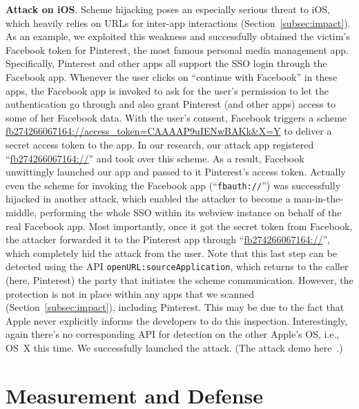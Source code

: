 \documentclass{article}
\begin{document}
\vspace {3pt}\noindent\textbf{Attack on iOS}. Scheme hijacking poses an especially serious threat to iOS, which heavily relies on URLs for inter-app interactions (Section~\ref{subsec:impact}).  As an example, we exploited this weakness and successfully obtained the victim's Facebook token for Pinterest, the most famous personal media management app. Specifically, Pinterest and other apps all support the SSO login through the Facebook app. Whenever the user clicks on ``continue with Facebook'' in these apps, the Facebook app is invoked to ask for the user's permission to let the authentication go through and also grant Pinterest (and other apps) access to some of her Facebook data.  With the user's consent, Facebook triggers a scheme \url{fb274266067164://access_token=CAAAAP9uIENwBAKk&X=Y} to deliver a secret access token to the app. In our research, our attack app registered ``\url{fb274266067164://}'' and took over this scheme. As a result, Facebook unwittingly launched our app and passed to it Pinterest's access token. Actually even the scheme for invoking the Facebook app (``\texttt{fbauth://}'') was successfully hijacked in another attack, which enabled the attacker to become a man-in-the-middle, performing the whole SSO within its webview instance on behalf of the real Facebook app. Most importantly, once it got the secret token from Facebook, the attacker forwarded it to the Pinterest app through ``\url{fb274266067164://}'', which completely hid the attack from the user. Note that this last step can be detected using the API \texttt{openURL:sourceApplication}, which returns to the caller (here, Pinterest) the party that initiates the scheme communication. However, the protection is not in place within any apps that we scanned (Section~\ref{subsec:impact}), including Pinterest. This may be due to the fact that Apple never explicitly informs the developers to do this inspection. Interestingly, again there's no corresponding API for detection on the other Apple's OS, i.e., OS~X this time. We successfully launched the attack. (The attack demo here~\cite{supporting}.)




\vspace {-5pt}
\section{Measurement and Defense}
\label{sec:detectandmeasure}
\end{document}

